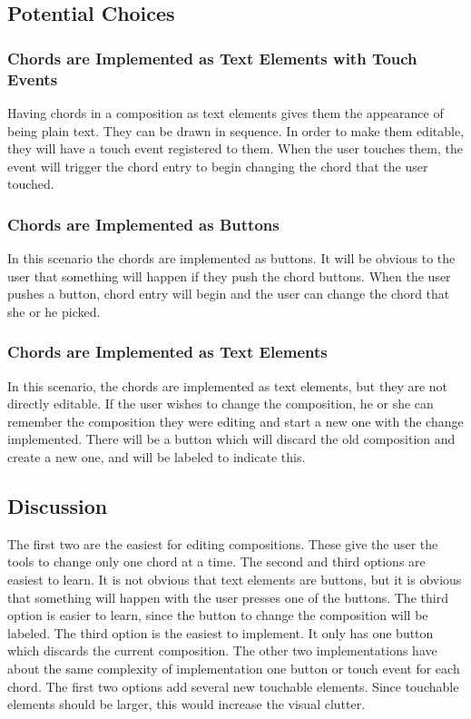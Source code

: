 \documentclass[onecolumn, draftclsnofoot,10pt, compsoc]{IEEEtran}
\begin{document}
\subsection{Potential Choices}
\subsubsection{Chords are Implemented as Text Elements with Touch Events}
Having chords in a composition as text elements gives them the appearance of being plain text. 
They can be drawn in sequence. 
In order to make them editable, they will have a touch event registered to them. 
When the user touches them, the event will trigger the chord entry to begin changing the chord that the user touched. 
\subsubsection{Chords are Implemented as Buttons}
In this scenario the chords are implemented as buttons. 
It will be obvious to the user that something will happen if they push the chord buttons. 
When the user pushes a button, chord entry will begin and the user can change the chord that she or he picked. 
\subsubsection{Chords are Implemented as Text Elements}
In this scenario, the chords are implemented as text elements, but they are not directly editable. 
If the user wishes to change the composition, he or she can remember the composition they were editing and start a new one with the change implemented. 
There will be a button which will discard the old composition and create a new one, and will be labeled to indicate this.
\subsection{Discussion}
The first two are the easiest for editing compositions.
These give the user the tools to change only one chord at a time.
The second and third options are easiest to learn.
It is not obvious that text elements are buttons, but it is obvious that something will happen with the user presses one of the buttons.
\cite{uxplanet}
The third option is easier to learn, since the button to change the composition will be labeled.
The third option is the easiest to implement.
It only has one button which discards the current composition.
The other two implementations have about the same complexity of implementation one button or touch event for each chord.
The first two options add several new touchable elements.
Since touchable elements should be larger, this would increase the visual clutter.
\cite{apple}
\end{document}
